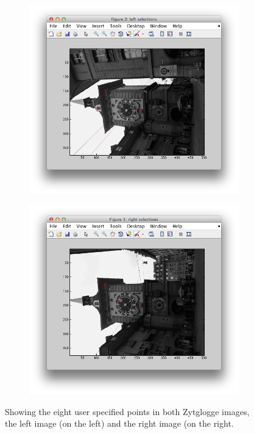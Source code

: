 \documentclass{paper}
\begin{document}
\begin{figure}[H]
\centering
\begin{subfigure}{0.49\textwidth}
\includegraphics[width=\textwidth]{figures/zytglogge_left_selected_points}
\end{subfigure}
\begin{subfigure}{0.49\textwidth}
\includegraphics[width=\textwidth]{figures/zytglogge_right_selected_points}
\end{subfigure}
\caption{Showing the eight user specified points in both Zytglogge images, the left image (on the left) and the right image (on the right.}
\label{fig:zyt_userselection}
\end{figure}
\end{document}

